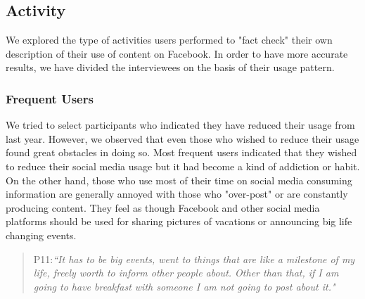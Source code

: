 \subsection{Activity}
We explored the type of activities users performed to "fact check" their own description of their use of content on Facebook. In order to have more accurate results, we have divided the interviewees on the basis of their usage pattern.

\subsubsection{Frequent Users}
We tried to select participants who indicated they have reduced their usage from last year. However, we observed that even those who wished to reduce their usage found great obstacles in doing so. Most frequent users indicated that they wished to reduce their social media usage but it had become a kind of addiction or habit. On the other hand, those who use most of their time on social media consuming information are generally annoyed with those who "over-post" or are constantly producing content. They feel as though Facebook and other social media platforms should be used for sharing pictures of vacations or announcing big life changing events.
\begin{quote}
P11:\textit{``It has to be big events, went to things that are like a milestone of my life, freely worth to inform other people about. Other than that, if I am going to have breakfast with someone I am not going to post about it."}
\end{quote}

